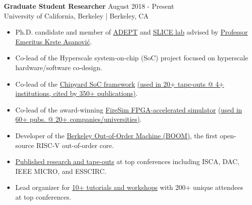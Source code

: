 \documentclass[line]{res}
\begin{document}
\begin{resume}
\textbf{Graduate Student Researcher} \hfill August 2018 - Present
\\
University of California, Berkeley | Berkeley, CA
\\
\vspace{-3mm}
\begin{itemize}
\item Ph.D. candidate and member of \href{https://adept.eecs.berkeley.edu/}{ADEPT} and \href{https://slice.eecs.berkeley.edu/}{SLICE lab} advised by \href{https://people.eecs.berkeley.edu/~krste/}{Professor Emeritus Krste Asanovi\'c}.
\item Co-lead of the Hyperscale system-on-chip (SoC) project focused on hyperscale hardware/software co-design.
\item Co-lead of the \href{https://github.com/ucb-bar/chipyard}{Chipyard SoC framework} \href{https://scholar.google.com/scholar?cites=4549882523608568335&as_sdt=2005&sciodt=0,5&hl=en}{(used in 20+ tape-outs @ 4+ institutions, cited by 350+ publications)}.
\item Co-lead of the award-winning \href{https://fires.im/}{FireSim FPGA-accelerated simulator} \href{https://fires.im/publications/#userpapers}{(used in 60+ pubs. @ 20+ companies/universities)}.
\item Developer of the \href{https://boom-core.org/}{Berkeley Out-of-Order Machine (BOOM)}, the first open-source RISC-V out-of-order core.
\item \href{https://scholar.google.com/citations?user=dsAQJ4cAAAAJ&hl=en}{Published research and tape-outs} at top conferences including ISCA, DAC, IEEE MICRO, and ESSCIRC.
\item Lead organizer for \href{https://fires.im/blog/}{10+ tutorials and workshops} with 200+ unique attendees at top conferences.
\end{itemize}

\vspace{-3mm}


\end{resume}
\end{document}
